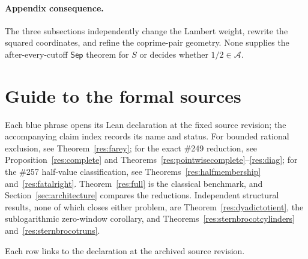 \documentclass[11pt]{article}
\theoremstyle{definition}
\theoremstyle{remark}
\begin{document}
\paragraph{Appendix consequence.}
The three subsections independently change the Lambert weight, rewrite the
squared coordinates, and refine the coprime-pair geometry.  None supplies the
after-every-cutoff \(\mathsf{Sep}\) theorem for \(S\) or decides whether \(1/2\in\mathcal A\).

\section{Guide to the formal sources}\label{app:index}

Each blue phrase opens its Lean declaration at the fixed source revision; the
accompanying claim index records its name and status.  For bounded rational
exclusion, see Theorem~\ref{res:farey}; for the exact \#249 reduction, see
Proposition~\ref{res:complete} and Theorems~\ref{res:pointwisecomplete}--\ref{res:diag};
for the \#257 half-value classification, see Theorems~\ref{res:halfmembership}
and~\ref{res:fatalright}.  Theorem~\ref{res:full} is the classical benchmark,
and Section~\ref{sec:architecture} compares the reductions.  Independent
structural results, none of which closes either problem, are
Theorem~\ref{res:dyadictotient}, the sublogarithmic zero-window corollary, and
Theorems~\ref{res:sternbrocotcylinders} and~\ref{res:sternbrocotruns}.

\iffalse

Each row links to the declaration at the archived source revision.
\end{document}
